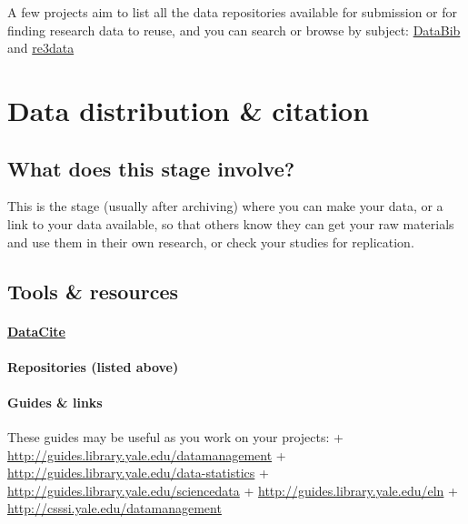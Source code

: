 \documentclass{tufte-handout}
\begin{document}
A few projects aim to list all the data repositories available for
submission or for finding research data to reuse, and you can search or
browse by subject: \href{http://databib.org/}{DataBib} and \href{http://www.re3data.org}{re3data}


\section{Data distribution \&
citation}\label{data-distribution-citation} 

\subsection{What does this stage
involve?}\label{what-does-this-stage-involve-1}

This is the stage (usually after archiving) where you can make your
data, or a link to your data available, so that others know they can get
your raw materials and use them in their own research, or check your
studies for replication.

\subsection{Tools \& resources}\label{what-tools-and-resources-are-available-3}

\paragraph{\href{https://www.datacite.org/}{DataCite}}\label{datacite}

\paragraph{Repositories (listed above)}\label{repositories-listed-above}



\paragraph{Guides \& links}\label{guides-links}

These guides may be useful as you work on your projects: +
\url{http://guides.library.yale.edu/datamanagement} +
\url{http://guides.library.yale.edu/data-statistics} +
\url{http://guides.library.yale.edu/sciencedata} +
\url{http://guides.library.yale.edu/eln} +
\url{http://csssi.yale.edu/datamanagement}
\end{document}
